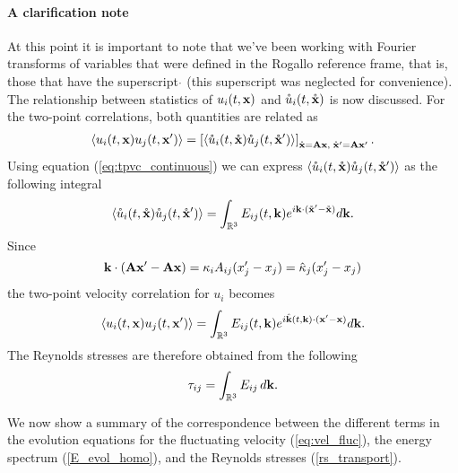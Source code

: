 \documentclass[oneside,a4paper,11pt]{report}
\newcommand{\rs}{\tau}          %
\newcommand{\est}{E}            %
\newcommand{\uifluc}{u_i}
\newcommand{\ujfluc}{u_j}
\begin{document}
\paragraph{A clarification note}
At this point it is important to note that we've been working with Fourier transforms of variables that were defined in the Rogallo reference frame, that is, those that have the superscript $\mathring{}$ (this superscript was neglected for convenience). The relationship between statistics of $\uifluc(t,\xvec)$ and $\mathring{u}_i(t,\mathring{\mathbf{x}})$ is now discussed. For the two-point correlations, both quantities are related as
\begin{equation}
\langle \uifluc(t,\xvec) \ujfluc(t,\xvec') \rangle = \left [ \langle \urog_i(t,\xrogvec) \urog_j(t,\xrogvec') \rangle \right ]_{\xrogvec = \bold{A}\xvec, \; \xrogvec' = \bold{A}\xvec'}.
\end{equation}
Using equation (\ref{eq:tpvc_continuous}) we can express $\langle \mathring{u}_i(t,\mathring{\mathbf{x}}) \mathring{u}_j(t,\mathring{\mathbf{x}}') \rangle$ as the following integral
\begin{equation}
\langle \mathring{u}_i(t,\mathring{\mathbf{x}}) \mathring{u}_j(t,\mathring{\mathbf{x}}') \rangle = \int_{\mathbb{R}^3} E_{ij}(t,\mathbf{k}) e^{i\mathbf{k} \cdot (\mathring{\mathbf{x}}' - \mathring{\mathbf{x}})} d\mathbf{k}.
\end{equation}
Since
\begin{equation}
\mathbf{k} \cdot ( \mathbf{A} \mathbf{x}' - \mathbf{A} \mathbf{x}) = \kappa_iA_{ij} (x'_j - x_j) = \hat{\kappa}_j (x'_j - x_j)
\end{equation}
the two-point velocity correlation for $\uifluc$ becomes
\begin{equation}
\langle u_i(t,\mathbf{x}) u_j(t,\mathbf{x}') \rangle = \int_{\mathbb{R}^3} E_{ij}(t,\mathbf{k}) e^{i \hat{\mathbf{k}}(t,\mathbf{k}) \cdot ( \mathbf{x}' - \mathbf{x})} d\mathbf{k} .
\end{equation}
The Reynolds stresses are therefore obtained from the following
\begin{equation}
\rs_{ij} = \int_\Rthree \est_{ij} \, d\kvec.
\end{equation}

We now show a summary of the correspondence between the different terms in the evolution equations for the fluctuating velocity (\ref{eq:vel_fluc}), the energy spectrum (\ref{E_evol_homo}), and the Reynolds stresses (\ref{rs_transport}).
\end{document}

